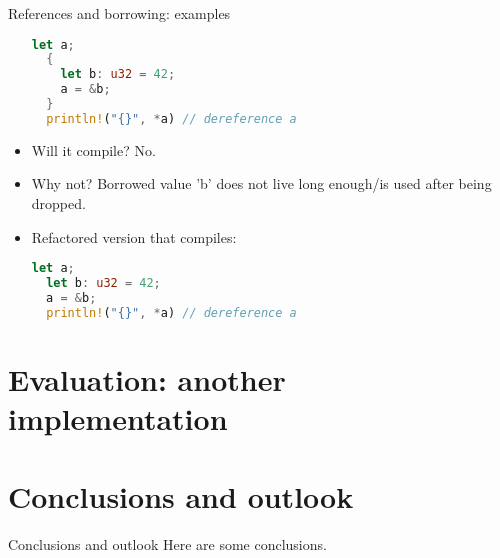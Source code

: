 \documentclass{beamer}
\begin{document}
\begin{frame}[fragile]{References and borrowing: examples}
\begin{itemize}
  \begin{lstlisting}[language=Rust]
  let a;
  {
    let b: u32 = 42;
    a = &b;
  }
  println!("{}", *a) // dereference a
  \end{lstlisting}

  \item Will it compile? \pause No.
  \item Why not? \pause Borrowed value 'b' does not live long enough/is used after being dropped.
  \item Refactored version that compiles:\pause

  \begin{lstlisting}[language=Rust]
  let a;
  let b: u32 = 42;
  a = &b;
  println!("{}", *a) // dereference a
  \end{lstlisting}
\end{itemize}
\end{frame}


\section{Evaluation: another implementation}



\section{Conclusions and outlook}

\begin{frame}{Conclusions and outlook}
  Here are some conclusions.
\end{frame}
\end{document}
